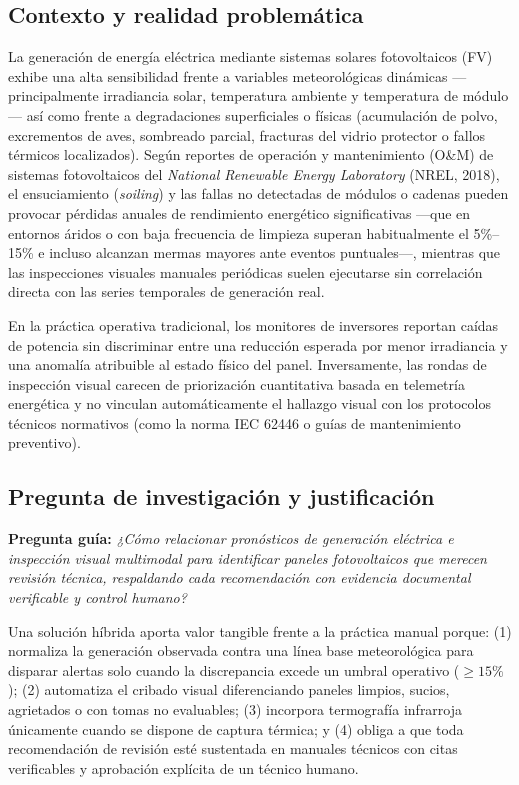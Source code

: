 \documentclass[12pt,a4paper]{article}
\begin{document}
\subsection{Contexto y realidad problemática}
La generación de energía eléctrica mediante sistemas solares fotovoltaicos (FV) exhibe una alta sensibilidad frente a variables meteorológicas dinámicas —principalmente irradiancia solar, temperatura ambiente y temperatura de módulo— así como frente a degradaciones superficiales o físicas (acumulación de polvo, excrementos de aves, sombreado parcial, fracturas del vidrio protector o fallos térmicos localizados). Según reportes de operación y mantenimiento (O\&M) de sistemas fotovoltaicos del \textit{National Renewable Energy Laboratory} (NREL, 2018), el ensuciamiento (\textit{soiling}) y las fallas no detectadas de módulos o cadenas pueden provocar pérdidas anuales de rendimiento energético significativas —que en entornos áridos o con baja frecuencia de limpieza superan habitualmente el 5\%–15\% e incluso alcanzan mermas mayores ante eventos puntuales—, mientras que las inspecciones visuales manuales periódicas suelen ejecutarse sin correlación directa con las series temporales de generación real.

En la práctica operativa tradicional, los monitores de inversores reportan caídas de potencia sin discriminar entre una reducción esperada por menor irradiancia y una anomalía atribuible al estado físico del panel. Inversamente, las rondas de inspección visual carecen de priorización cuantitativa basada en telemetría energética y no vinculan automáticamente el hallazgo visual con los protocolos técnicos normativos (como la norma IEC 62446 o guías de mantenimiento preventivo).

\subsection{Pregunta de investigación y justificación}
\textbf{Pregunta guía:} \textit{¿Cómo relacionar pronósticos de generación eléctrica e inspección visual multimodal para identificar paneles fotovoltaicos que merecen revisión técnica, respaldando cada recomendación con evidencia documental verificable y control humano?}

Una solución híbrida aporta valor tangible frente a la práctica manual porque: (1) normaliza la generación observada contra una línea base meteorológica para disparar alertas solo cuando la discrepancia excede un umbral operativo ($\geq 15\%$); (2) automatiza el cribado visual diferenciando paneles limpios, sucios, agrietados o con tomas no evaluables; (3) incorpora termografía infrarroja únicamente cuando se dispone de captura térmica; y (4) obliga a que toda recomendación de revisión esté sustentada en manuales técnicos con citas verificables y aprobación explícita de un técnico humano.
\end{document}
